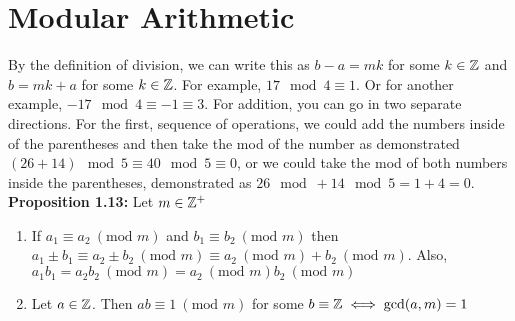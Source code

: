 \section{Modular Arithmetic}


By the definition of division, we can write this as \(b - a = mk\) for some \(k \in \mathbb{Z}\) and \(b = mk + a\) for some \(k \in \mathbb{Z}\). For example, \(17\mod 4 \equiv 1\). Or for another example, \(-17\mod 4 \equiv -1 \equiv 3\). For addition, you can go in two separate directions. For the first, sequence of operations, we could add the numbers inside of the parentheses and then take the mod of the number as demonstrated \((26 + 14)\mod 5 \equiv 40 \mod 5 \equiv 0\), or we could take the mod of both numbers inside the parentheses, demonstrated as \(26\mod + 14\mod 5 = 1 + 4 = 0\). \\

\hypertarget{prop 1.13}{\textbf{Proposition 1.13:}} Let \(m \in \mathbb{Z}^+\)
\begin{enumerate}
    \item If \(a_1 \equiv a_2 \ (\text{mod } m)\) and \(b_1 \equiv b_2 \ (\text{mod } m)\) then \(a_1 \pm b_1 \equiv a_2 \pm b_2 \ (\text{mod } m) \equiv a_2\ (\text{mod } m) + b_2\ (\text{mod } m)\). Also, \(a_1b_1 = a_2b_2\ (\text{mod } m)=a_2\ (\text{mod } m) b_2\ (\text{mod } m)\)
    \item Let \(a \in \mathbb{Z}\). Then \(ab \equiv 1\ (\text{mod } m)\) for some \(b\equiv \mathbb{Z} \iff \gcd(a,m)=1\)
\end{enumerate}


